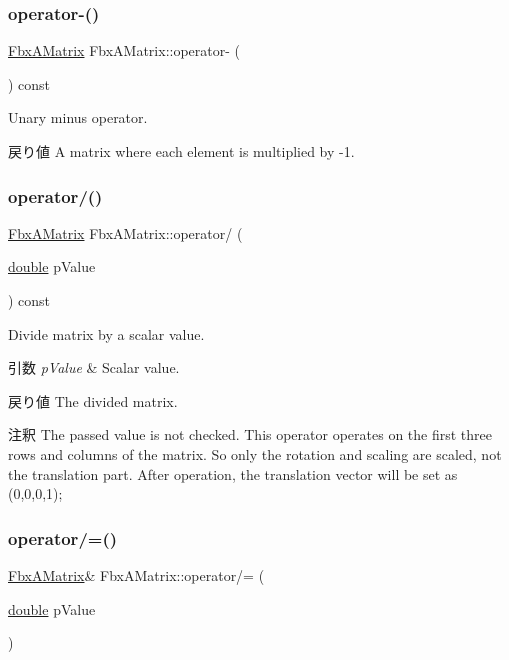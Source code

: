 \subsubsection{\texorpdfstring{operator-\/()}{operator-()}}
{\footnotesize\ttfamily \hyperlink{class_fbx_a_matrix}{Fbx\+A\+Matrix} Fbx\+A\+Matrix\+::operator-\/ (\begin{DoxyParamCaption}{ }\end{DoxyParamCaption}) const}

Unary minus operator. \begin{DoxyReturn}{戻り値}
A matrix where each element is multiplied by -\/1. 
\end{DoxyReturn}
\mbox{\label{class_fbx_a_matrix_a48795bab1963bb8f5d963080f3d04149}} 
\subsubsection{\texorpdfstring{operator/()}{operator/()}}
{\footnotesize\ttfamily \hyperlink{class_fbx_a_matrix}{Fbx\+A\+Matrix} Fbx\+A\+Matrix\+::operator/ (\begin{DoxyParamCaption}\item[{\hyperlink{class_fbx_a_matrix_ad463edbb9fea344643297701f159faa7}{double}}]{p\+Value }\end{DoxyParamCaption}) const}

Divide matrix by a scalar value. 
\begin{DoxyParams}{引数}
{\em p\+Value} & Scalar value. \\
\hline
\end{DoxyParams}
\begin{DoxyReturn}{戻り値}
The divided matrix. 
\end{DoxyReturn}
\begin{DoxyRemark}{注釈}
The passed value is not checked. This operator operates on the first three rows and columns of the matrix. So only the rotation and scaling are scaled, not the translation part. After operation, the translation vector will be set as (0,0,0,1); 
\end{DoxyRemark}
\mbox{\label{class_fbx_a_matrix_af77d3a14cae3687b56d7e14e326473d6}} 
\subsubsection{\texorpdfstring{operator/=()}{operator/=()}}
{\footnotesize\ttfamily \hyperlink{class_fbx_a_matrix}{Fbx\+A\+Matrix}\& Fbx\+A\+Matrix\+::operator/= (\begin{DoxyParamCaption}\item[{\hyperlink{class_fbx_a_matrix_ad463edbb9fea344643297701f159faa7}{double}}]{p\+Value }\end{DoxyParamCaption})}

